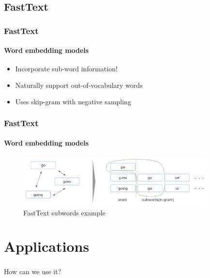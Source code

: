 

\subsection{FastText}


\begin{frame}
\frametitle{FastText}
	\framesubtitle{Word embedding models}

	\begin{itemize}
		\item Incorporate sub-word information!
		\item Naturally support out-of-vocabulary words
		\item Uses skip-gram with negative sampling
	\end{itemize}

\end{frame}

\begin{frame}
\frametitle{FastText}
	\framesubtitle{Word embedding models}

	\begin{figure}
		\includegraphics[width=10cm]{./figures/fasttext}
		\caption{FastText subwords example}
	\end{figure}

\end{frame}


\section{Applications}


\begin{frame}
\frametitle{}

\begin{center}
	\Huge {How can we use it?}
\end{center}
\end{frame}

